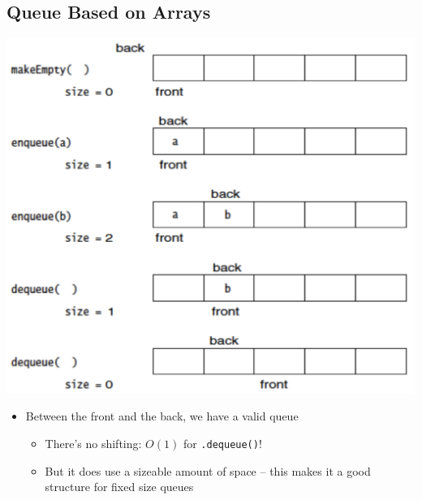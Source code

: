 \documentclass[10pt]{article}
\begin{document}
\subsection*{Queue Based on Arrays}
\begin{center}
\includegraphics[width=\textwidth/2]{images/6.png}
\end{center}
\begin{itemize}
    \item Between the front and the back, we have a valid queue
    \begin{itemize}
        \item There's no shifting: $O(1)$ for \texttt{.dequeue()}!
        \item But it does use a sizeable amount of space -- this makes it a good structure for fixed size queues
    \end{itemize}
\end{itemize}
\end{document}
